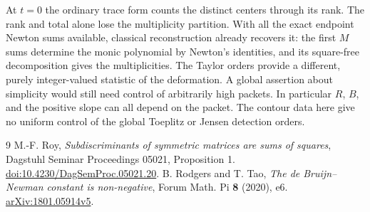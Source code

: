 \documentclass[11pt]{article}
\begin{document}
At $t=0$ the ordinary trace form counts the distinct centers through its rank. The rank and total alone lose the multiplicity partition. With all the exact endpoint Newton sums available, classical reconstruction already recovers it: the first $M$ sums determine the monic polynomial by Newton's identities, and its square-free decomposition gives the multiplicities. The Taylor orders provide a different, purely integer-valued statistic of the deformation. A global assertion about simplicity would still need control of arbitrarily high packets. In particular $R$, $B$, and the positive slope can all depend on the packet. The contour data here give no uniform control of the global Toeplitz or Jensen detection orders.

\begin{thebibliography}{9}
 M.-F. Roy, \emph{Subdiscriminants of symmetric matrices are sums of squares}, Dagstuhl Seminar Proceedings 05021, Proposition 1. \href{https://doi.org/10.4230/DagSemProc.05021.20}{doi:10.4230/DagSemProc.05021.20}.
 B. Rodgers and T. Tao, \emph{The de Bruijn--Newman constant is non-negative}, Forum Math. Pi \textbf{8} (2020), e6. \href{https://arxiv.org/abs/1801.05914v5}{arXiv:1801.05914v5}.
\end{thebibliography}
\end{document}
